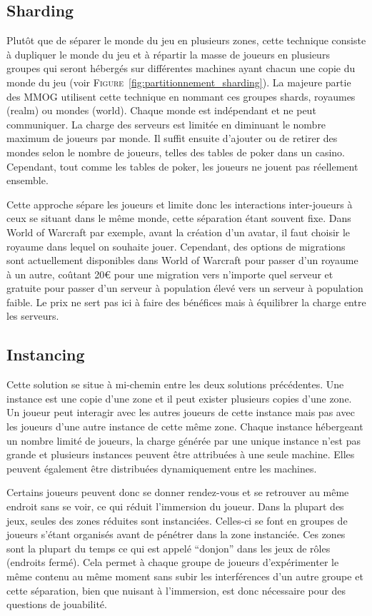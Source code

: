 \subsection{Sharding}
Plutôt que de séparer le monde du jeu en plusieurs zones, cette technique consiste à dupliquer le monde du jeu et à répartir la masse de joueurs en plusieurs groupes qui seront hébergés sur différentes machines ayant chacun une copie du monde du jeu (voir \textsc{Figure}~\ref{fig:partitionnement_sharding}).
La majeure partie des MMOG utilisent cette technique en nommant ces groupes shards, royaumes (realm) ou mondes (world).
Chaque monde est indépendant et ne peut communiquer.
La charge des serveurs est limitée en diminuant le nombre maximum de joueurs par monde.
Il suffit ensuite d'ajouter ou de retirer des mondes selon le nombre de joueurs, telles des tables de poker dans un casino.
Cependant, tout comme les tables de poker, les joueurs ne jouent pas réellement ensemble.

Cette approche sépare les joueurs et limite donc les interactions inter-joueurs à ceux se situant dans le même monde, cette séparation étant souvent fixe.
Dans World of Warcraft par exemple, avant la création d'un avatar, il faut choisir le royaume dans lequel on souhaite jouer.
Cependant, des options de migrations sont actuellement disponibles dans World of Warcraft pour passer d'un royaume à un autre, coûtant 20\euro{} pour une migration vers n'importe quel serveur et gratuite pour passer d'un serveur à population élevé vers un serveur à population faible.
Le prix ne sert pas ici à faire des bénéfices mais à équilibrer la charge entre les serveurs.

\subsection{Instancing}
Cette solution se situe à mi-chemin entre les deux solutions précédentes.
Une instance est une copie d'une zone et il peut exister plusieurs copies d'une zone.
Un joueur peut interagir avec les autres joueurs de cette instance mais pas avec les joueurs d'une autre instance de cette même zone.
Chaque instance hébergeant un nombre limité de joueurs, la charge générée par une unique instance n'est pas grande et plusieurs instances peuvent être attribuées à une seule machine.
Elles peuvent également être distribuées dynamiquement entre les machines.

Certains joueurs peuvent donc se donner rendez-vous et se retrouver au même endroit sans se voir, ce qui réduit l'immersion du joueur.
Dans la plupart des jeux, seules des zones réduites sont instanciées.
Celles-ci se font en groupes de joueurs s'étant organisés avant de pénétrer dans la zone instanciée.
Ces zones sont la plupart du temps ce qui est appelé ``donjon'' dans les jeux de rôles (endroits fermé).
Cela permet à chaque groupe de joueurs d'expérimenter le même contenu au même moment sans subir les interférences d'un autre groupe et cette séparation, bien que nuisant à l'immersion, est donc nécessaire pour des questions de jouabilité.

